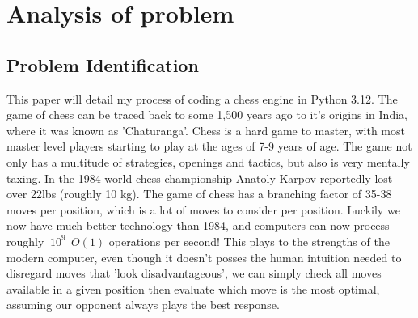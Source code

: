 \section{Analysis of problem}
\subsection{Problem Identification}
This paper will detail my process of coding a chess engine in 
Python 3.12. The game of chess can be traced back to some 1,500
years ago to it's origins in India, where it was known as 
'Chaturanga'. Chess is a hard game to master, with most master
level players starting to play at the ages of 7-9 years of age. 
The game not only has a multitude of strategies, openings and 
tactics, but also is very mentally taxing. In the 1984 world 
chess championship Anatoly Karpov reportedly lost over 22lbs 
(roughly 10 kg). The game of chess has a branching factor of 
35-38 moves per position, which is a lot of moves to consider per
position. Luckily we now have much better technology than 1984, 
and computers can now process roughly $~ 10^9 \: \: O(1)$
operations per second! This plays to the strengths of the 
modern computer, even though it doesn't posses the human 
intuition needed to disregard moves that 'look disadvantageous', 
we can simply check all moves available in a given position then 
evaluate which move is the most optimal, assuming our opponent 
always plays the best response.

